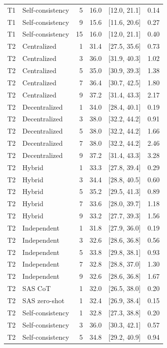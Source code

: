 \begin{tabular}{@{}llrrrr@{}}
T1 & Self-consistency & 5 & 16.0 & [12.0, 21.1] & 0.14 \\
T1 & Self-consistency & 9 & 15.6 & [11.6, 20.6] & 0.27 \\
T1 & Self-consistency & 15 & 16.0 & [12.0, 21.1] & 0.40 \\
T2 & Centralized & 1 & 31.4 & [27.5, 35.6] & 0.73 \\
T2 & Centralized & 3 & 36.0 & [31.9, 40.3] & 1.02 \\
T2 & Centralized & 5 & 35.0 & [30.9, 39.3] & 1.38 \\
T2 & Centralized & 7 & 36.4 & [30.7, 42.5] & 1.80 \\
T2 & Centralized & 9 & 37.2 & [31.4, 43.3] & 2.17 \\
T2 & Decentralized & 1 & 34.0 & [28.4, 40.1] & 0.19 \\
T2 & Decentralized & 3 & 38.0 & [32.2, 44.2] & 0.91 \\
T2 & Decentralized & 5 & 38.0 & [32.2, 44.2] & 1.66 \\
T2 & Decentralized & 7 & 38.0 & [32.2, 44.2] & 2.46 \\
T2 & Decentralized & 9 & 37.2 & [31.4, 43.3] & 3.28 \\
T2 & Hybrid & 1 & 33.3 & [27.8, 39.4] & 0.29 \\
T2 & Hybrid & 3 & 34.4 & [28.8, 40.5] & 0.60 \\
T2 & Hybrid & 5 & 35.2 & [29.5, 41.3] & 0.89 \\
T2 & Hybrid & 7 & 33.6 & [28.0, 39.7] & 1.18 \\
T2 & Hybrid & 9 & 33.2 & [27.7, 39.3] & 1.56 \\
T2 & Independent & 1 & 31.8 & [27.9, 36.0] & 0.19 \\
T2 & Independent & 3 & 32.6 & [28.6, 36.8] & 0.56 \\
T2 & Independent & 5 & 33.8 & [29.8, 38.1] & 0.93 \\
T2 & Independent & 7 & 32.8 & [28.8, 37.0] & 1.30 \\
T2 & Independent & 9 & 32.6 & [28.6, 36.8] & 1.67 \\
T2 & SAS CoT & 1 & 32.0 & [26.5, 38.0] & 0.20 \\
T2 & SAS zero-shot & 1 & 32.4 & [26.9, 38.4] & 0.15 \\
T2 & Self-consistency & 1 & 32.8 & [27.3, 38.8] & 0.20 \\
T2 & Self-consistency & 3 & 36.0 & [30.3, 42.1] & 0.57 \\
T2 & Self-consistency & 5 & 34.8 & [29.2, 40.9] & 0.94 \\

\end{tabular}
